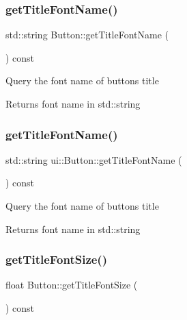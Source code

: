 \subsubsection{\texorpdfstring{get\+Title\+Font\+Name()}{getTitleFontName()}\hspace{0.1cm}{\footnotesize\ttfamily [1/2]}}
{\footnotesize\ttfamily std\+::string Button\+::get\+Title\+Font\+Name (\begin{DoxyParamCaption}{ }\end{DoxyParamCaption}) const}

Query the font name of button\textquotesingle{}s title \begin{DoxyReturn}{Returns}
font name in std\+::string 
\end{DoxyReturn}
\mbox{\label{classui_1_1Button_aff1b77c013256e67d34aafa756e852db}} 
\subsubsection{\texorpdfstring{get\+Title\+Font\+Name()}{getTitleFontName()}\hspace{0.1cm}{\footnotesize\ttfamily [2/2]}}
{\footnotesize\ttfamily std\+::string ui\+::\+Button\+::get\+Title\+Font\+Name (\begin{DoxyParamCaption}{ }\end{DoxyParamCaption}) const}

Query the font name of button\textquotesingle{}s title \begin{DoxyReturn}{Returns}
font name in std\+::string 
\end{DoxyReturn}
\mbox{\label{classui_1_1Button_adaf7175abd1a8f0c1d00ed8cc32679cb}} 
\subsubsection{\texorpdfstring{get\+Title\+Font\+Size()}{getTitleFontSize()}\hspace{0.1cm}{\footnotesize\ttfamily [1/2]}}
{\footnotesize\ttfamily float Button\+::get\+Title\+Font\+Size (\begin{DoxyParamCaption}{ }\end{DoxyParamCaption}) const}

